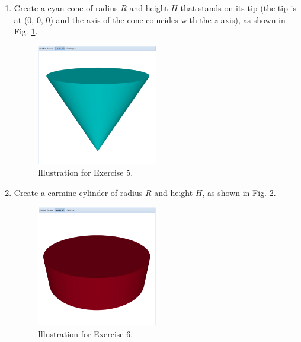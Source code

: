 \documentclass{article}
\begin{document}
\begin{enumerate}
\item Create a cyan cone of radius $R$ and height $H$ that stands on its tip
(the tip is at (0, 0, 0) and the axis of the cone coincides with the 
$z$-axis), as shown in Fig. \ref{fig:a5}.

\begin{figure}[!ht]
\begin{center}
\includegraphics[width=0.5\textwidth]{img/a5-cyan-cone.png}
\end{center}
\vspace{-4mm}
\caption{Illustration for Exercise 5.}
\label{fig:a5}
\end{figure}

\item  Create a carmine cylinder of radius $R$ and height $H$, 
as shown in Fig. \ref{fig:a6}.

\begin{figure}[!ht]
\begin{center}
\includegraphics[width=0.5\textwidth]{img/a6-carmine-cylinder.png}
\end{center}
\vspace{-2mm}
\caption{Illustration for Exercise 6.}
\label{fig:a6}
\end{figure}
\newpage


\end{enumerate}
\end{document}

